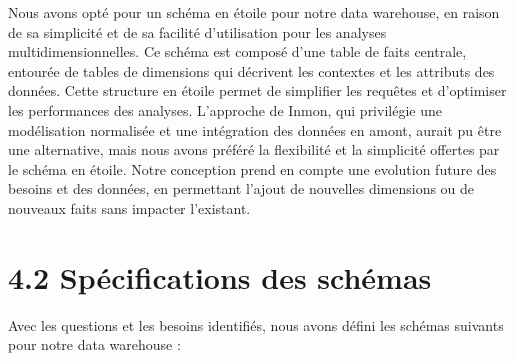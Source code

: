 Nous avons opté pour un schéma en étoile pour notre data warehouse, en raison de sa simplicité et de sa facilité d’utilisation pour les analyses multidimensionnelles.
Ce schéma est composé d’une table de faits centrale, entourée de tables de dimensions qui décrivent les contextes et les attributs des données.
Cette structure en étoile permet de simplifier les requêtes et d’optimiser les performances des analyses.
L'approche de Inmon, qui privilégie une modélisation normalisée et une intégration des données en amont, aurait pu être une alternative, mais nous avons préféré la flexibilité et la simplicité offertes par le schéma en étoile.
Notre conception prend en compte une evolution future des besoins et des données, en permettant l’ajout de nouvelles dimensions ou de nouveaux faits sans impacter l’existant.

\section*{4.2 Spécifications des schémas}

Avec les questions et les besoins identifiés, nous avons défini les schémas suivants pour notre data warehouse :


